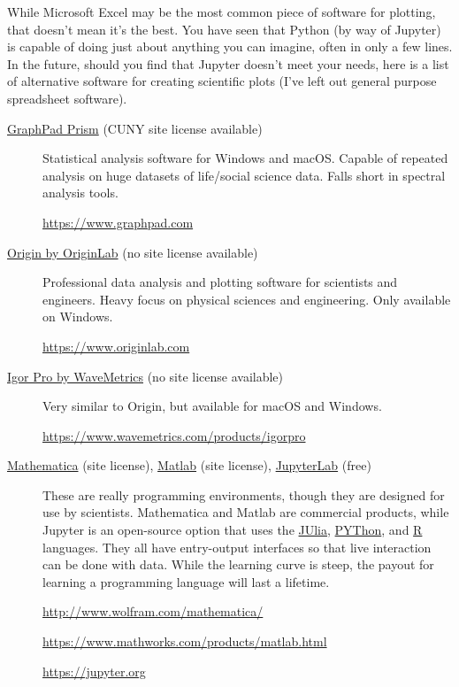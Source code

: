 \documentclass[nobib,nofonts,nols,nohyper]{tufte-handout}
\begin{document}
While Microsoft Excel may be the most common piece of software for plotting,  that doesn't mean it's the best.
You have seen that Python (by way of Jupyter) is capable of doing just about anything you can imagine, often in only a few lines.
In the future, should you find that Jupyter doesn't meet your needs, here is a list of alternative software for creating scientific plots (I've left out general purpose spreadsheet software).
\begin{description}
	\item[\href{https://www.graphpad.com}{GraphPad Prism} (CUNY site license available)] Statistical analysis software for Windows and macOS.
	Capable of repeated analysis on huge datasets of life/social science data.
	Falls short in spectral analysis tools.

	\url{https://www.graphpad.com}

	\item[\href{https://www.originlab.com}{Origin by OriginLab} (no site license available)] Professional data analysis and plotting software for scientists and engineers.
	Heavy focus on physical sciences and engineering.
	Only available on Windows.

	\url{https://www.originlab.com}

	\item[\href{https://www.wavemetrics.com/products/igorpro}{Igor Pro by WaveMetrics} (no site license available)] Very similar to Origin, but available for macOS and Windows.

	\url{https://www.wavemetrics.com/products/igorpro}

	\item[\href{http://www.wolfram.com/mathematica/}{Mathematica} (site license),
	\href{https://www.mathworks.com/products/matlab.html}{Matlab} (site license),
	\href{https://jupyter.org}{JupyterLab} (free)]
	These are really programming environments, though they are designed for use by scientists. Mathematica and Matlab are commercial products, while Jupyter is an open-source option that uses the \href{https://julialang.org}{JUlia},
  \href{https://www.python.org}{PYThon}, and \href{https://www.r-project.org}{R} languages.
	They all have entry-output interfaces so that live interaction can be done with data.
	While the learning curve is steep, the payout for learning a programming language will last a lifetime.

	\url{http://www.wolfram.com/mathematica/}

	\url{https://www.mathworks.com/products/matlab.html}

	\url{https://jupyter.org}

\end{description}

\nocite{*}
\printbibliography[category=cited]%

\printbibliography[%
  title={Further Reading},%
  resetnumbers,%
  omitnumbers,%
	notcategory=cited,%
	]
\end{document}
